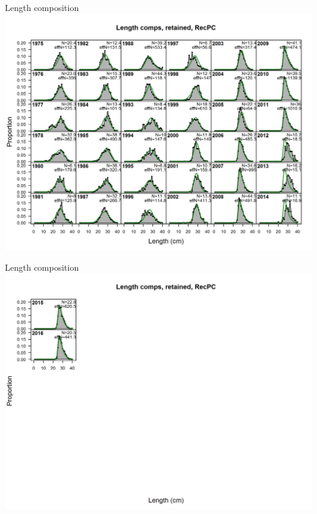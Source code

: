 \documentclass[ignorenonframetext,compress]{beamer}
\begin{document}
\begin{frame}{Length composition}\includegraphics{./r4ss/plots_mod1/comp_lenfit_flt5mkt2_page1.png}\end{frame}

\begin{frame}{Length composition}\includegraphics{./r4ss/plots_mod1/comp_lenfit_flt5mkt2_page2.png}\end{frame}
\end{document}

